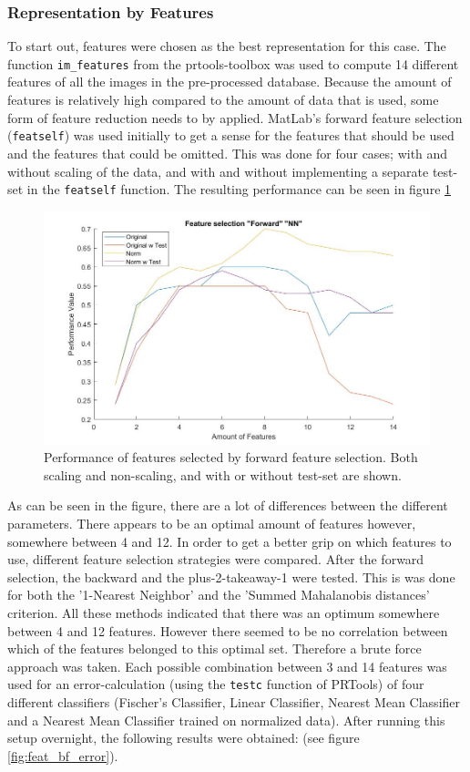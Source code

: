 \subsubsection*{Representation by Features}
To start out, features were chosen as the best representation for this case. The function \texttt{im\_features} from the prtools-toolbox was used to compute 14 different features of all the images in the pre-processed database. Because the amount of features is relatively high compared to the amount of data that is used, some form of feature reduction needs to by applied. MatLab's forward feature selection (\texttt{featself}) was used initially to get a sense for the features that should be used and the features that could be omitted. This was done for four cases; with and without scaling of the data, and with and without implementing a separate test-set in the \texttt{featself} function. The resulting performance can be seen in figure \ref{fig:featsel_perf}
\begin{figure}[H]
	\centering
	\includegraphics[scale=0.45]{images/featsel_perf.jpg}
	\caption{Performance of features selected by forward feature selection. Both scaling and non-scaling, and with or without test-set are shown.}
	\label{fig:featsel_perf}
\end{figure}
\noindent As can be seen in the figure, there are a lot of differences between the different parameters. There appears to be an optimal amount of features however, somewhere between 4 and 12. In order to get a better grip on which features to use, different feature selection strategies were compared.  After the forward selection, the backward and the plus-2-takeaway-1 were tested. This is was done for both the '1-Nearest Neighbor' and the 'Summed Mahalanobis distances' criterion. All these methods indicated that there was an optimum somewhere between 4 and 12 features. However there seemed to be no correlation between which of the features belonged to this optimal set. Therefore a brute force approach was taken. Each possible combination between 3 and 14 features was used for an error-calculation (using the \texttt{testc}  function of PRTools) of four different classifiers (Fischer's Classifier, Linear Classifier, Nearest Mean Classifier and a Nearest Mean Classifier trained on normalized data). After running this setup overnight, the following results were obtained: (see figure \ref{fig:feat_bf_error}).
